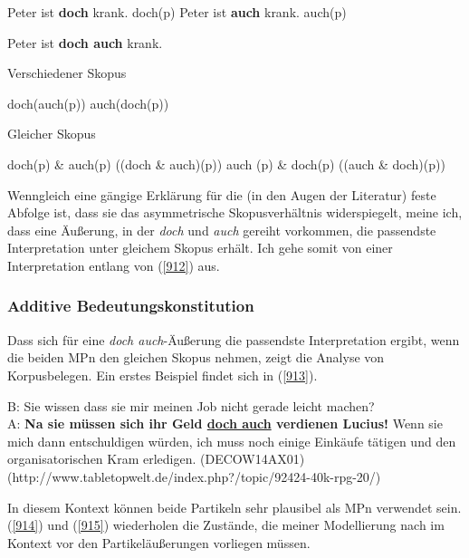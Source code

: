 {\begin{exe}
	\ex\label{909} 
		\begin{xlist}	
			\ex\label{909a} Peter ist \textbf{doch} krank. doch(p)
			\ex\label{909b} Peter ist \textbf{auch} krank. auch(p)
		\end{xlist}
\end{exe}

\begin{exe}
	\ex\label{910} 
		Peter ist \textbf{doch auch} krank.
\end{exe}
	
\begin{exe}
	\ex\label{911} Verschiedener Skopus\\[-1em]
		\begin{xlist}
			\ex\label{911a} doch(auch(p))
			\ex\label{911b} auch(doch(p))
		\end{xlist}
\end{exe}

\begin{exe}
	\ex\label{912} Gleicher Skopus\\[-1em]
		\begin{xlist} 	
			\ex\label{912a} doch(p) \& auch(p) ((doch \& auch)(p))
			\ex\label{912b} auch (p) \& doch(p)	((auch \& doch)(p)) 
		\end{xlist}
\end{exe}
Wenngleich eine gängige Erklärung für die (in den Augen der Literatur) feste Abfolge ist, dass sie das asymmetrische Skopusverhältnis  widerspiegelt, meine ich, dass eine Äußerung, in der \textit{doch} und \textit{auch} gereiht vorkommen, die passendste Interpretation unter gleichem Skopus erhält. Ich gehe somit von einer Interpretation entlang von (\ref{912}) aus.

\subsubsection{Additive Bedeutungskonstitution}
Dass sich für eine \textit{doch auch}-Äußerung die passendste Interpretation ergibt, wenn die beiden MPn den gleichen Skopus nehmen, zeigt die Analyse von Korpusbelegen. Ein erstes Beispiel findet sich in (\ref{913}).

\begin{exe}
	\ex\label{913} 
	\scriptsize
	B: \glqq Sie wissen dass sie mir meinen Job nicht gerade leicht machen?\grqq{}\\
	A: \glqq \textbf{Na sie müssen sich ihr Geld \underline{doch auch} verdienen Lucius!} Wenn sie mich dann entschuldigen würden, ich muss noch einige Einkäufe tätigen und den organisatorischen Kram erledigen.\grqq{}
	\newline
	\hbox{}\hfill\hbox{(DECOW14AX01)}
	\newline
	\hbox{}\hfill\hbox{(http://www.tabletopwelt.de/index.php?/topic/92424-40k-rpg-20/)}
\end{exe}
In diesem Kontext können beide Partikeln sehr plausibel als MPn verwendet sein. (\ref{914}) und (\ref{915}) wiederholen die Zustände, die meiner Modellierung nach im Kontext vor den Partikeläußerungen vorliegen müssen.

}
